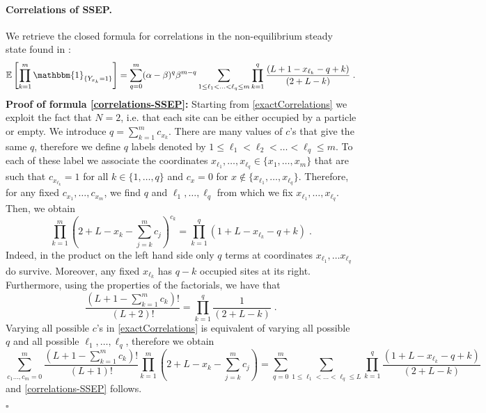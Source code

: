 \documentclass[10pt]{article}
\numberwithin{equation}{section}
\numberwithin{equation}{subsection}
\newcommand{\dt}{\;.}
\begin{document}
\paragraph{Correlations of SSEP.}
We retrieve the closed formula for correlations in the non-equilibrium steady state found in \cite[(4.26)]{frassek2020eigenstates}:  
\begin{equation}\label{correlations-SSEP}
	\mathbb{E}\left[\prod_{k=1}^{m}\mathbbm{1}_{\{Y_{x_{k}}=1\}}\right]=\sum_{q=0}^{m}(\alpha-\beta)^{q}\beta^{m-q}\sum_{1\leq \ell_{1}<\ldots<\ell_{q}\leq m}\prod_{k=1}^{q}\frac{\left(L+1-x_{\ell_{k}}-q+k\right)}{(2+L-k)}\dt
\end{equation} 
\textbf{Proof of formula \eqref{correlations-SSEP}:} Starting from \eqref{exactCorrelations} we exploit {\color{blue} the fact that $N=2$, i.e. that each site can be either occupied by a particle or empty.} We introduce $q=\sum_{k=1}^{m}c_{x_{k}}$. There are many values of $c$'s that give the same $q$, therefore we define {\color{blue} $q$ labels denoted by } %
$1\leq \ell_{1}<\ell_{2}<\ldots<\ell_{q}\leq m$. 
To each of these label we associate the coordinates $x_{\ell_{1}},\ldots,x_{\ell_{q}}\in\{x_{1},\dots,x_{m}\}$ that are such that $c_{x_{\ell_{k}}}=1$ for all $k\in \{1,\ldots,q\}$ and $c_{x}=0$ for $x\notin \{x_{\ell_{1}},\ldots,x_{\ell_{q}}\}$. Therefore, for any fixed $c_{x_{1}},\ldots,c_{x_{m}}$, we find $q$ and $\ell_{1},\ldots,\ell_{q}$ from which we fix $x_{\ell_{1}},\ldots,x_{\ell_{q}}$. Then, we obtain  
	\begin{equation}
		\prod_{k=1}^{m}\left(2+L-x_{k}-\sum_{j=k}^{m}c_{j}\right)^{c_{k}}=\prod_{k=1}^{q}\left(1+L-x_{\ell_{k}}-q+k\right)\dt
	\end{equation}
Indeed, in the product on the left hand side only $q$ terms at coordinates $x_{\ell_{1}},\ldots x_{\ell_{q}}$ do survive. Moreover, any fixed $x_{\ell_{k}}$ has $q-k$ occupied sites at its right.
Furthermore, using the properties of the factorials, we have that 
\begin{equation}\label{Gamma-product}
	\frac{(L+1-\sum_{k=1}^{m}c_{k})!}{(L+2)!}=\prod_{k=1}^{q}\frac{1}{(2+L-k)}\dt
\end{equation}
Varying all possible $c$'s in \eqref{exactCorrelations} is equivalent of varying all possible $q$ and all possible $\ell_{1},\ldots,\ell_{q}$, therefore we obtain 
\begin{equation}
	\sum_{c_{1}\ldots,c_{m}=0}^{m}\frac{(L+1-\sum_{k=1}^{m}c_{k})!}{(L+1)!}\prod_{k=1}^{m}\left(2+L-x_{k}-\sum_{j=k}^{m}c_{j}\right)=\sum_{q=0}^{m}\sum_{1\leq \ell_{1}<\ldots<\ell_{q}\leq L}\prod_{k=1}^{q}\frac{(1+L-x_{\ell_{k}}-q+k)}{(2+L-k)}
\end{equation} 
and \eqref{correlations-SSEP} follows. 
\begin{flushright}
	$\square$
\end{flushright}
\end{document}
